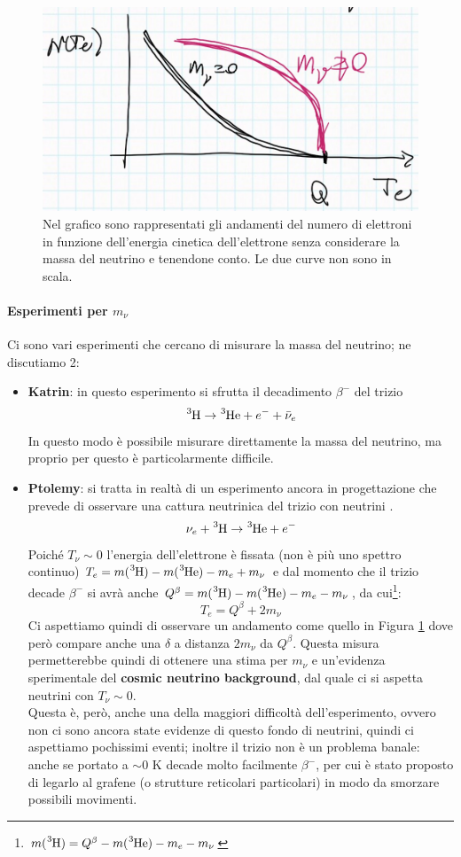 \begin{figure}[h]
    \centering
    \includegraphics[scale=0.3]{Immagini/0304_neutrini.png}
    \caption{Nel grafico sono rappresentati gli andamenti del numero di elettroni in funzione dell'energia cinetica dell'elettrone senza considerare la massa del neutrino e tenendone conto. Le due curve non sono in scala.}
    \label{0304_nu}
\end{figure}

\paragraph{Esperimenti per $m_\nu$} Ci sono vari esperimenti che cercano di misurare la massa del neutrino; ne discutiamo 2:
\begin{itemize}
    \item \textbf{Katrin}: in questo esperimento si sfrutta il decadimento $\beta^-$ del trizio
    $$\ce{^3H}\to\ce{^3He} + e^- +\bar{\nu}_e$$
    In questo modo è possibile misurare direttamente la massa del neutrino, ma proprio per questo è particolarmente difficile.
    \item \textbf{Ptolemy}: si tratta in realtà di un esperimento ancora in progettazione che prevede di osservare una cattura neutrinica del trizio con neutrini .
    $$\nu_e + \ce{^3H}\to\ce{^3He} + e^-$$
    Poiché $T_\nu\sim 0$ l'energia dell'elettrone è fissata (non è più uno spettro continuo) $T_e = m(\ce{^3H}) - m(\ce{^3He}) -m_e +m_\nu $ e dal momento che il trizio decade $\beta^-$ si avrà anche $Q^\beta = m(\ce{^3H})-m(\ce{^3He})-m_e-m_\nu$, da cui\footnote{$m(\ce{^3H}) =Q^\beta -m(\ce{^3He})-m_e-m_\nu$}:
    $$T_e = Q^\beta + 2m_\nu$$
    Ci aspettiamo quindi di osservare un andamento come quello in Figura \ref{0304_nu} dove però compare anche una $\delta$ a distanza $2m_\nu$ da $Q^\beta$. Questa misura permetterebbe quindi di ottenere una stima per $m_\nu$ e un'evidenza sperimentale del \textbf{cosmic neutrino background}, dal quale ci si aspetta neutrini con $T_\nu\sim 0 $.\\
    Questa è, però, anche una della maggiori difficoltà dell'esperimento, ovvero non ci sono ancora state evidenze di questo fondo di neutrini, quindi ci aspettiamo pochissimi eventi; inoltre  il trizio non è un problema banale: anche se portato a $\sim 0$ K decade molto facilmente $\beta^-$, per cui è stato proposto di legarlo al grafene (o strutture reticolari particolari) in modo da smorzare possibili movimenti.
\end{itemize}

